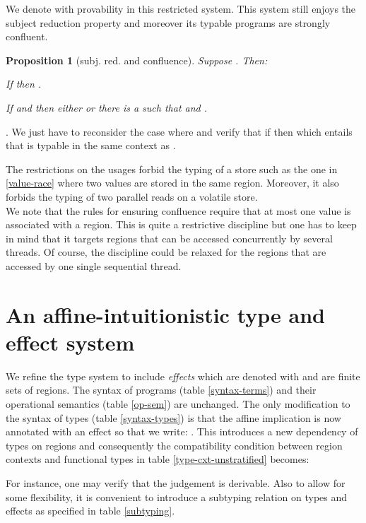 \documentclass[11pt]{article}
\newcommand{\Proofitem}[1]{\medskip \noindent }
\newcommand{\Proofitemf}[1]{\noindent }
\newcommand{\Defitem}[1]{\smallskip \noindent }
\newtheorem{proposition}[theorem]{Proposition}
\newcommand{\Proof}{\noindent {\sc Proof}. }
\newcommand{\qed}{\hfill}
\begin{document}
\begin{table}
{\footnotesize
}
\caption{Restricted usages and restricted rules for confluence}\label{rules-confluence}
\end{table}
We denote with  provability in this restricted system.
This system still enjoys the subject reduction property and moreover
its typable programs are strongly confluent.

\begin{proposition}[subj. red. and confluence]\label{confluence-thm}
Suppose . Then:

\Defitem{(1)} If  then .

\Defitem{(2)} If  and  then either  or
there is a  such that  and .
\end{proposition}
\Proof
\Proofitemf{(1)} We just have to reconsider the case
where  and verify
that if  then 
 which entails that
 is typable in the same context as 
.

\Proofitem{(2)} The restrictions on the usages forbid the typing of
a store such as the one in \ref{value-race}  where two values are stored
in the same region. Moreover, it also forbids the typing of two parallel reads
on a volatile store. \qed \\


We note that the rules for ensuring confluence require that at most
one value is associated with a region. This is quite a restrictive
discipline but one has to keep in mind that it targets regions that
can be accessed concurrently by several threads. Of course, the
discipline could be relaxed for the regions that are accessed by one
single sequential thread.


\section{An affine-intuitionistic type and effect system}
\label{aitype-effect-sec}
We refine the type system to include {\em effects} which are
denoted with  and are finite sets of regions.
The syntax of programs (table \ref{syntax-terms}) and their 
operational semantics (table \ref{op-sem}) are unchanged.
The only modification to the syntax of types (table \ref{syntax-types}) is that 
the affine implication is now annotated with an effect
so that we write:
.
This introduces a new dependency
of types on regions and consequently the compatibility condition between
region contexts and functional types in table \ref{type-cxt-unstratified} 
becomes:

For instance, one may verify that the judgement  is 
derivable.
Also to allow for some flexibility, it is convenient to introduce a
subtyping relation on types and effects as specified in table \ref{subtyping}.
\begin{table}
{\footnotesize
}
\caption{Subtyping induced by effect containment}\label{subtyping}
\end{table}
\end{document}
